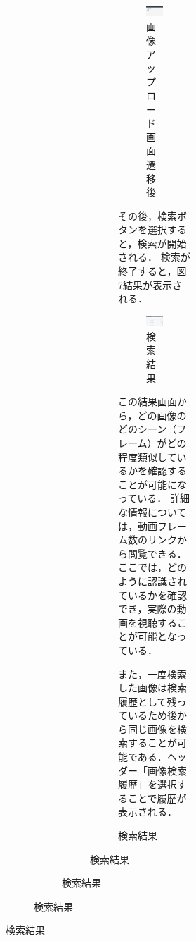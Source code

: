 \documentclass[a4j,12pt,dvipdfmx]{jreport}
\begin{document}
\begin{figure}[H]
\begin{figure}[H]
\begin{figure}[H]
\begin{figure}[H]
\begin{figure}[H]
\begin{figure}[b]
  \centering
  \includegraphics[width=13cm]{image/image_upload.jpg}
  \caption{画像アップロード画面遷移後}
  \label{fig:image_upload}
\end{figure}


その後，検索ボタンを選択すると，検索が開始される．
検索が終了すると，図\ref{fig:search_result}結果が表示される．

\begin{figure}[b]
  \centering
  \includegraphics[width=13cm]{image/search_result.jpg}
  \caption{検索結果}
  \label{fig:search_result}
\end{figure}


この結果画面から，どの画像のどのシーン（フレーム）がどの程度類似しているかを確認することが可能になっている．
詳細な情報については，動画フレーム数のリンクから閲覧できる．ここでは，どのように認識されているかを確認でき，実際の動画を視聴することが可能となっている．

また，一度検索した画像は検索履歴として残っているため後から同じ画像を検索することが可能である．ヘッダー「画像検索履歴」を選択することで履歴が表示される．


\end{figure}
\end{figure}
\end{figure}
\end{figure}
\end{figure}
\end{document}
